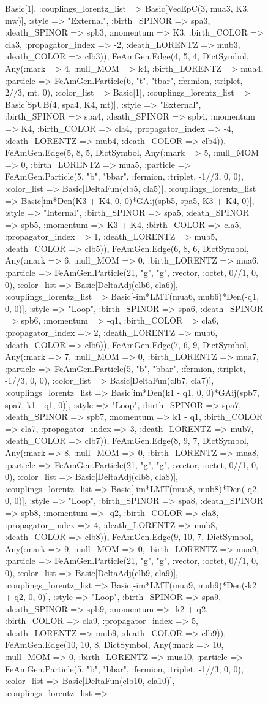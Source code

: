 \documentclass{revtex4}
\begin{document}
\begin{figure}[!htb]
\begin{center}
{Basic[1], :couplings_lorentz_list => Basic[VecEpC(3, mua3, K3, mw)], :style => "External", :birth_SPINOR => spa3, :death_SPINOR => spb3, :momentum => K3, :birth_COLOR => cla3, :propagator_index => -2, :death_LORENTZ => mub3, :death_COLOR => clb3)), FeAmGen.Edge(4, 5, 4, Dict{Symbol, Any}(:mark => 4, :null_MOM => k4, :birth_LORENTZ => mua4, :particle => FeAmGen.Particle(6, "t", "tbar", :fermion, :triplet, 2//3, mt, 0), :color_list => Basic[1], :couplings_lorentz_list => Basic[SpUB(4, spa4, K4, mt)], :style => "External", :birth_SPINOR => spa4, :death_SPINOR => spb4, :momentum => K4, :birth_COLOR => cla4, :propagator_index => -4, :death_LORENTZ => mub4, :death_COLOR => clb4)), FeAmGen.Edge(5, 8, 5, Dict{Symbol, Any}(:mark => 5, :null_MOM => 0, :birth_LORENTZ => mua5, :particle => FeAmGen.Particle(5, "b", "bbar", :fermion, :triplet, -1//3, 0, 0), :color_list => Basic[DeltaFun(clb5, cla5)], :couplings_lorentz_list => Basic[im*Den(K3 + K4, 0, 0)*GAij(spb5, spa5, K3 + K4, 0)], :style => "Internal", :birth_SPINOR => spa5, :death_SPINOR => spb5, :momentum => K3 + K4, :birth_COLOR => cla5, :propagator_index => 1, :death_LORENTZ => mub5, :death_COLOR => clb5)), FeAmGen.Edge(6, 8, 6, Dict{Symbol, Any}(:mark => 6, :null_MOM => 0, :birth_LORENTZ => mua6, :particle => FeAmGen.Particle(21, "g", "g", :vector, :octet, 0//1, 0, 0), :color_list => Basic[DeltaAdj(clb6, cla6)], :couplings_lorentz_list => Basic[-im*LMT(mua6, mub6)*Den(-q1, 0, 0)], :style => "Loop", :birth_SPINOR => spa6, :death_SPINOR => spb6, :momentum => -q1, :birth_COLOR => cla6, :propagator_index => 2, :death_LORENTZ => mub6, :death_COLOR => clb6)), FeAmGen.Edge(7, 6, 9, Dict{Symbol, Any}(:mark => 7, :null_MOM => 0, :birth_LORENTZ => mua7, :particle => FeAmGen.Particle(5, "b", "bbar", :fermion, :triplet, -1//3, 0, 0), :color_list => Basic[DeltaFun(clb7, cla7)], :couplings_lorentz_list => Basic[im*Den(k1 - q1, 0, 0)*GAij(spb7, spa7, k1 - q1, 0)], :style => "Loop", :birth_SPINOR => spa7, :death_SPINOR => spb7, :momentum => k1 - q1, :birth_COLOR => cla7, :propagator_index => 3, :death_LORENTZ => mub7, :death_COLOR => clb7)), FeAmGen.Edge(8, 9, 7, Dict{Symbol, Any}(:mark => 8, :null_MOM => 0, :birth_LORENTZ => mua8, :particle => FeAmGen.Particle(21, "g", "g", :vector, :octet, 0//1, 0, 0), :color_list => Basic[DeltaAdj(clb8, cla8)], :couplings_lorentz_list => Basic[-im*LMT(mua8, mub8)*Den(-q2, 0, 0)], :style => "Loop", :birth_SPINOR => spa8, :death_SPINOR => spb8, :momentum => -q2, :birth_COLOR => cla8, :propagator_index => 4, :death_LORENTZ => mub8, :death_COLOR => clb8)), FeAmGen.Edge(9, 10, 7, Dict{Symbol, Any}(:mark => 9, :null_MOM => 0, :birth_LORENTZ => mua9, :particle => FeAmGen.Particle(21, "g", "g", :vector, :octet, 0//1, 0, 0), :color_list => Basic[DeltaAdj(clb9, cla9)], :couplings_lorentz_list => Basic[-im*LMT(mua9, mub9)*Den(-k2 + q2, 0, 0)], :style => "Loop", :birth_SPINOR => spa9, :death_SPINOR => spb9, :momentum => -k2 + q2, :birth_COLOR => cla9, :propagator_index => 5, :death_LORENTZ => mub9, :death_COLOR => clb9)), FeAmGen.Edge(10, 10, 8, Dict{Symbol, Any}(:mark => 10, :null_MOM => 0, :birth_LORENTZ => mua10, :particle => FeAmGen.Particle(5, "b", "bbar", :fermion, :triplet, -1//3, 0, 0), :color_list => Basic[DeltaFun(clb10, cla10)], :couplings_lorentz_list => }
\end{center}
\end{figure}
\end{document}

